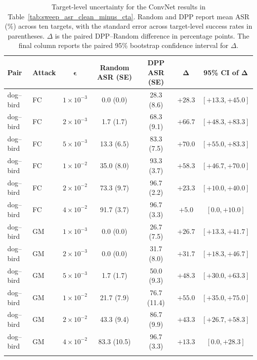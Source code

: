 \begin{table}[p]
\centering
\caption{
Target-level uncertainty for the ConvNet results in
Table~\ref{tab:sweep_asr_clean_minus_cta}. Random and DPP report mean
ASR (\%) across ten targets, with the standard error across target-level
success rates in parentheses. $\Delta$ is the paired DPP--Random
difference in percentage points. The final column reports the paired
95\% bootstrap confidence interval for $\Delta$.
}
\label{tab:main-stats-convnet}
\scriptsize
\setlength{\tabcolsep}{5pt}
\renewcommand{\arraystretch}{1.08}
\begin{tabular}{llccccc}
\toprule
\textbf{Pair} &
\textbf{Attack} &
$\boldsymbol{\epsilon}$ &
\textbf{Random ASR (SE)} &
\textbf{DPP ASR (SE)} &
$\boldsymbol{\Delta}$ &
\textbf{95\% CI of $\boldsymbol{\Delta}$} \\
\midrule

dog--bird & FC & $1{\times}10^{-3}$ & 0.0 (0.0) & 28.3 (8.6) & $+28.3$ & $[+13.3, +45.0]$ \\
dog--bird & FC & $2{\times}10^{-3}$ & 1.7 (1.7) & 68.3 (9.1) & $+66.7$ & $[+48.3, +83.3]$ \\
dog--bird & FC & $5{\times}10^{-3}$ & 13.3 (6.5) & 83.3 (7.5) & $+70.0$ & $[+55.0, +83.3]$ \\
dog--bird & FC & $1{\times}10^{-2}$ & 35.0 (8.0) & 93.3 (3.7) & $+58.3$ & $[+46.7, +70.0]$ \\
dog--bird & FC & $2{\times}10^{-2}$ & 73.3 (9.7) & 96.7 (2.2) & $+23.3$ & $[+10.0, +40.0]$ \\
dog--bird & FC & $4{\times}10^{-2}$ & 91.7 (3.7) & 96.7 (3.3) & $+5.0$ & $[0.0, +10.0]$ \\
\addlinespace[2pt]

dog--bird & GM & $1{\times}10^{-3}$ & 0.0 (0.0) & 26.7 (7.5) & $+26.7$ & $[+13.3, +41.7]$ \\
dog--bird & GM & $2{\times}10^{-3}$ & 0.0 (0.0) & 31.7 (8.0) & $+31.7$ & $[+18.3, +46.7]$ \\
dog--bird & GM & $5{\times}10^{-3}$ & 1.7 (1.7) & 50.0 (9.3) & $+48.3$ & $[+30.0, +63.3]$ \\
dog--bird & GM & $1{\times}10^{-2}$ & 21.7 (7.9) & 76.7 (11.4) & $+55.0$ & $[+35.0, +75.0]$ \\
dog--bird & GM & $2{\times}10^{-2}$ & 43.3 (9.4) & 86.7 (9.9) & $+43.3$ & $[+26.7, +58.3]$ \\
dog--bird & GM & $4{\times}10^{-2}$ & 83.3 (10.5) & 96.7 (3.3) & $+13.3$ & $[0.0, +28.3]$ \\
\addlinespace[2pt]


\end{tabular}
\end{table}

